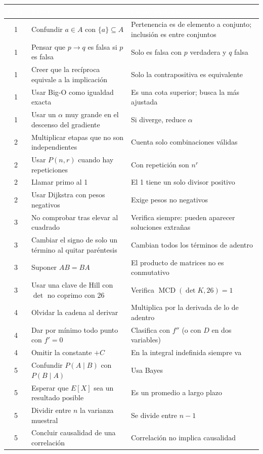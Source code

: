 \begin{center}
\renewcommand{\arraystretch}{1.35}
\begin{tabular}{|c|p{5.4cm}|p{6.2cm}|}
\hline
\rowcolor{tmCoral}\textcolor{white}{\textbf{Cap.}} & \textcolor{white}{\textbf{Error}} & \textcolor{white}{\textbf{C\'omo evitarlo}}\\ \hline
1 & Confundir $a\in A$ con $\{a\}\subseteq A$ & Pertenencia es de elemento a conjunto; inclusi\'on es entre conjuntos\\ \hline
1 & Pensar que $p\to q$ es falsa si $p$ es falsa & Solo es falsa con $p$ verdadera y $q$ falsa\\ \hline
1 & Creer que la rec\'iproca equivale a la implicaci\'on & Solo la contrapositiva es equivalente\\ \hline
1 & Usar Big-O como igualdad exacta & Es una cota superior; busca la m\'as ajustada\\ \hline
1 & Usar un $\alpha$ muy grande en el descenso del gradiente & Si diverge, reduce $\alpha$\\ \hline
2 & Multiplicar etapas que no son independientes & Cuenta solo combinaciones v\'alidas\\ \hline
2 & Usar $P(n, r)$ cuando hay repeticiones & Con repetici\'on son $n^r$\\ \hline
2 & Llamar primo al 1 & El 1 tiene un solo divisor positivo\\ \hline
2 & Usar Dijkstra con pesos negativos & Exige pesos no negativos\\ \hline
3 & No comprobar tras elevar al cuadrado & Verifica siempre: pueden aparecer soluciones extra\~nas\\ \hline
3 & Cambiar el signo de solo un t\'ermino al quitar par\'entesis & Cambian todos los t\'erminos de adentro\\ \hline
3 & Suponer $AB=BA$ & El producto de matrices no es conmutativo\\ \hline
3 & Usar una clave de Hill con $\det$ no coprimo con 26 & Verifica $\operatorname{MCD}(\det K, 26)=1$\\ \hline
4 & Olvidar la cadena al derivar & Multiplica por la derivada de lo de adentro\\ \hline
4 & Dar por m\'inimo todo punto con $f'=0$ & Clasifica con $f''$ (o con $D$ en dos variables)\\ \hline
4 & Omitir la constante $+C$ & En la integral indefinida siempre va\\ \hline
5 & Confundir $P(A\mid B)$ con $P(B\mid A)$ & Usa Bayes\\ \hline
5 & Esperar que $E[X]$ sea un resultado posible & Es un promedio a largo plazo\\ \hline
5 & Dividir entre $n$ la varianza muestral & Se divide entre $n-1$\\ \hline
5 & Concluir causalidad de una correlaci\'on & Correlaci\'on no implica causalidad\\ \hline
\end{tabular}
\end{center}

